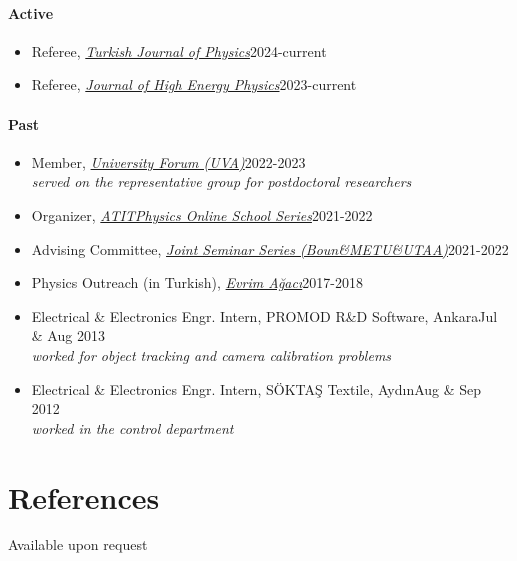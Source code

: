 \documentclass[a4paper,11pt]{article}
\begin{document}
\paragraph{Active}
\begin{itemize}
    \item[] Referee, \emph{\hyperref{https://journals.tubitak.gov.tr/physics/}{}{}{Turkish Journal of Physics}}\hfill 2024-current\hspace*{2.2em}
	\item[] Referee, \emph{\hyperref{https://jhep.sissa.it/}{}{}{Journal of High Energy Physics}}\hfill 2023-current
\end{itemize}
\paragraph{Past}
\begin{itemize}
	\item[] Member, \emph{\hyperref{https://www.uva.nl/en/about-the-uva/policy-and-regulations/policy/university-forum/university-forum.html}{}{}{University Forum (UVA)}}\hfill 2022-2023\hspace*{2.2em}\\
	    \hspace*{1.8em}\emph{served on the representative group for postdoctoral researchers}
	\item[] Organizer, \emph{\hyperref{https://www.atitphysics.com}{}{}{ATITPhysics Online School Series}}\hfill 2021-2022\hspace*{2.2em}
	\item[] Advising Committee, \emph{\hyperref{https://sites.google.com/view/boun-metu-utaajointseminerseri/}{}{}{Joint Seminar Series (Boun\&METU\&UTAA)}}\hfill 2021-2022\hspace*{2.2em}
	\item[] Physics Outreach (in Turkish), \emph{\hyperref{https://youtube.com/playlist?list=PL48IwtBKtXrZcWuuJFpcflBkSqJv6YrW9}{}{}{Evrim Ağacı}}\hfill 2017-2018
	\item[] Electrical \& Electronics Engr. Intern, PROMOD R\&D Software, Ankara\hfill Jul \& Aug 2013\\	
	    \hspace*{1.8em}\emph{worked for object tracking and camera calibration problems}
	\item[] Electrical \& Electronics Engr. Intern, SÖKTAŞ Textile, Aydın\hfill Aug \& Sep 2012\\	
	    \hspace*{1.8em}\emph{worked in the control department}
\end{itemize}

\section{\textcolor{burntorange}{References}}
\hspace*{2em}Available upon request

\end{document}
